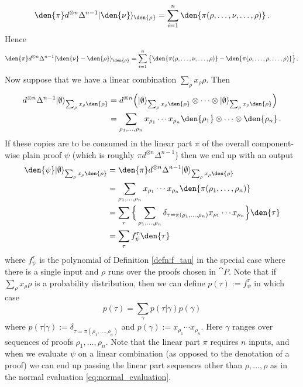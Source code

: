 \documentclass[english,letter paper,12pt,reqno]{article}
\DeclarePairedDelimiter\ket{\lvert}{\rangle}
\theoremstyle{definition}
\def\vacu{\ket{\emptyset}}
\def\be{\begin{equation}}
\def\ee{\end{equation}}
\begin{document}
\be
\den{\pi} d^{\otimes n} \Delta^{n-1} \ket{\den{\nu}}_{\den{\rho}} 
= \sum_{i=1}^n \den{\pi(\rho,\ldots,\nu,\ldots,\rho)}\,.
\ee
Hence
\be
\den{\pi} d^{\otimes n} \Delta^{n-1} \ket{\den{\nu} - \den{\rho}}_{\den{\rho}} 
= \sum_{i=1}^n \big\{ \den{\pi(\rho,\ldots,\nu,\ldots,\rho)} - \den{\pi(\rho,\ldots,\rho,\ldots,\rho)} \big\} \,.
\ee
Now suppose that we have a linear combination $\sum_\rho x_\rho \rho$. Then
\begin{align*}
d^{\otimes n} \Delta^{n-1} \vacu_{\sum_\rho x_\rho \den{\rho}} &= d^{\otimes n} \Big( \vacu_{\sum_\rho x_\rho \den{\rho}} \otimes \cdots \otimes \vacu_{\sum_\rho x_\rho \den{\rho}} \Big)\\
&= \sum_{\rho_1,\ldots,\rho_n} x_{\rho_1} \cdots x_{\rho_n} \den{\rho_1} \otimes \cdots \otimes \den{\rho_n}\,.
\end{align*}
If these copies are to be consumed in the linear part $\pi$ of the overall component-wise plain proof $\psi$ (which is roughly $\pi d^{\otimes n} \Delta^{n-1}$) then we end up with an output
\begin{align}
\den{\psi} \vacu_{\sum_\rho x_\rho \den{\rho}} &= \den{\pi} d^{\otimes n} \Delta^{n-1} \vacu_{\sum_\rho x_\rho \den{\rho}} \nonumber\\
&= \sum_{\rho_1,\ldots,\rho_n} x_{\rho_1} \cdots x_{\rho_n} \den{\pi(\rho_1,\ldots,\rho_n)} \nonumber\\
&= \sum_\tau \Big\{ \sum_{\rho_1,\ldots,\rho_n} \delta_{\tau = \pi(\rho_1,\ldots,\rho_n)} x_{\rho_1} \cdots x_{\rho_n} \Big\} \den{\tau} \nonumber\\
&= \sum_\tau f^\tau_\psi \den{\tau} \label{eq:compute_psi_general}
\end{align}
where $f^\tau_\psi$ is the polynomial of Definition \ref{defn:f_tau} in the special case where there is a single input and $\rho$ runs over the proofs chosen in $\cat{P}$. Note that if $\sum_\rho x_\rho \rho$ is a probability distribution, then we can define $p(\tau) := f^\tau_\psi$ in which case
\be\label{eq:comp_path_discover}
p(\tau) = \sum_\gamma p(\tau|\gamma) p(\gamma)
\ee
where $p(\tau|\gamma) := \delta_{\tau = \pi(\rho_1,\ldots,\rho_n)}$ and $p(\gamma) := x_{\rho_1} \cdots x_{\rho_n}$. Here $\gamma$ ranges over sequences of proofs $\rho_1,\ldots,\rho_n$. Note that the linear part $\pi$ requires $n$ inputs, and when we evaluate $\psi$ on a linear combination (as opposed to the denotation of a proof) we can end up passing the linear part sequences other than $\rho,\ldots,\rho$ as in the normal evaluation \eqref{eq:normal_evaluation}.
\end{document}

